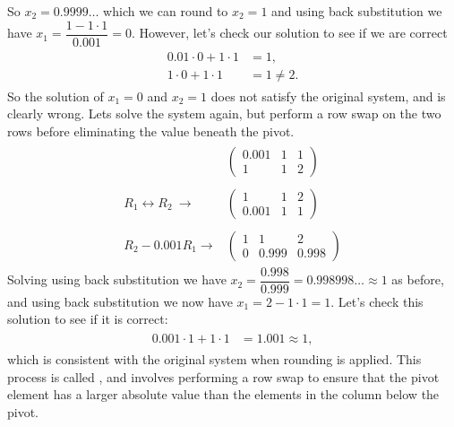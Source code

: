 \documentclass[letterpaper,10pt,english]{jupyterBook}
\begin{document}
\sphinxAtStartPar
So \(x_2 = 0.9999\ldots\) which we can round to \(x_2 = 1\) and using back substitution we have \(x_1 = \dfrac{1 - 1 \cdot 1}{0.001} = 0\). However, let’s check our solution to see if we are correct
\begin{equation*}
\begin{split} \begin{align*}
    0.01 \cdot 0 + 1 \cdot 1 &= 1, \\
    1 \cdot 0 + 1 \cdot 1 &= 1 \neq 2.
\end{align*} \end{split}
\end{equation*}
\sphinxAtStartPar
So the solution of \(x_1 = 0\) and \(x_2 = 1\) does not satisfy the original system, and is clearly wrong. Lets solve the system again, but perform a row swap on the two rows before eliminating the value beneath the pivot.
\begin{equation*}
\begin{split} \begin{align*}
    & \left(\begin{array}{cc|c}
        0.001 & 1 & 1 \\
        1 & 1 & 2
    \end{array} \right)
    \\ \\
    R_1 \leftrightarrow R_2  \ \longrightarrow &
    \left( \begin{array}{cc|c}
        1 & 1 & 2 \\
        0.001 & 1 & 1
    \end{array} \right)
	 \\ \\
     R_2 - 0.001 R_1  \longrightarrow &
    \left( \begin{array}{cc|c}
        1 & 1 & 2 \\
        0 & 0.999 & 0.998
    \end{array} \right)
\end{align*} \end{split}
\end{equation*}
\sphinxAtStartPar
Solving using back substitution we have \(x_2 = \dfrac{0.998}{0.999} = 0.998998\ldots \approx 1\) as before, and using back substitution we now have \(x_1 = 2 - 1 \cdot 1 = 1\). Let’s check this solution to see if it is correct:
\begin{equation*}
\begin{split} \begin{align*}
    0.001 \cdot 1 + 1 \cdot 1 &= 1.001 \approx 1,
\end{align*} \end{split}
\end{equation*}
\sphinxAtStartPar
which is consistent with the original system when rounding is applied. This process is called , and involves performing a row swap to ensure that the pivot element has a larger absolute value than the elements in the column below the pivot.
\end{document}
